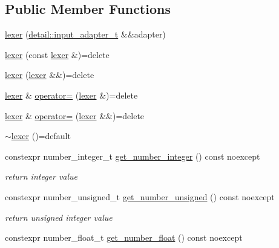 \subsection*{Public Member Functions}
\begin{DoxyCompactItemize}
\item 
\mbox{\hyperlink{classnlohmann_1_1detail_1_1lexer_ab6818e0fc05f4a52c65aeb967dd79919}{lexer}} (\mbox{\hyperlink{namespacenlohmann_1_1detail_ae132f8cd5bb24c5e9b40ad0eafedf1c2}{detail\+::input\+\_\+adapter\+\_\+t}} \&\&adapter)
\item 
\mbox{\hyperlink{classnlohmann_1_1detail_1_1lexer_a2e8ce2a0d266d148b69dfbcc2e4ad71a}{lexer}} (const \mbox{\hyperlink{classnlohmann_1_1detail_1_1lexer}{lexer}} \&)=delete
\item 
\mbox{\hyperlink{classnlohmann_1_1detail_1_1lexer_a9045348915010649fad1f15e80b6e34d}{lexer}} (\mbox{\hyperlink{classnlohmann_1_1detail_1_1lexer}{lexer}} \&\&)=delete
\item 
\mbox{\hyperlink{classnlohmann_1_1detail_1_1lexer}{lexer}} \& \mbox{\hyperlink{classnlohmann_1_1detail_1_1lexer_a33e97dee7c5faf1b36aff5b74a6c8f55}{operator=}} (\mbox{\hyperlink{classnlohmann_1_1detail_1_1lexer}{lexer}} \&)=delete
\item 
\mbox{\hyperlink{classnlohmann_1_1detail_1_1lexer}{lexer}} \& \mbox{\hyperlink{classnlohmann_1_1detail_1_1lexer_af8ab91a774484fa220ba073421c8f452}{operator=}} (\mbox{\hyperlink{classnlohmann_1_1detail_1_1lexer}{lexer}} \&\&)=delete
\item 
\mbox{\hyperlink{classnlohmann_1_1detail_1_1lexer_a2f2ef6f5aca9a0c48fcfb1290f7b2b0d}{$\sim$lexer}} ()=default
\item 
constexpr number\+\_\+integer\+\_\+t \mbox{\hyperlink{classnlohmann_1_1detail_1_1lexer_afa338d17c0a7e834c73104258a2c8ced}{get\+\_\+number\+\_\+integer}} () const noexcept
\begin{DoxyCompactList}\small\item\em return integer value \end{DoxyCompactList}\item 
constexpr number\+\_\+unsigned\+\_\+t \mbox{\hyperlink{classnlohmann_1_1detail_1_1lexer_a56640fb92293e0c17742ca3c814d74d6}{get\+\_\+number\+\_\+unsigned}} () const noexcept
\begin{DoxyCompactList}\small\item\em return unsigned integer value \end{DoxyCompactList}\item 
constexpr number\+\_\+float\+\_\+t \mbox{\hyperlink{classnlohmann_1_1detail_1_1lexer_ac013af35a21e9387993b19da5b3e0ae2}{get\+\_\+number\+\_\+float}} () const noexcept

\end{DoxyCompactItemize}
